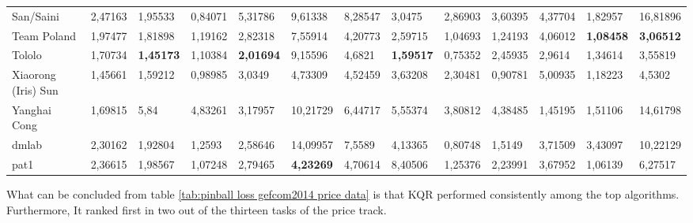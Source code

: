 \begin{table}[!ht]
\begin{adjustbox}{width=\textwidth}
\begin{tabular}{lllllllllllll}
  San/Saini                  & 2,47163          & 1,95533          & 0,84071 & 5,31786          & 9,61338          & 8,28547          & 3,0475           & 2,86903          & 3,60395          & 4,37704          & 1,82957          & 16,81896         \\
  Team Poland                & 1,97477          & 1,81898          & 1,19162          & 2,82318          & 7,55914          & 4,20773          & 2,59715          & 1,04693          & 1,24193          & 4,06012          & \textbf{1,08458} & \textbf{3,06512} \\
  Tololo                     & 1,70734          & \textbf{1,45173} & 1,10384          & \textbf{2,01694} & 9,15596          & 4,6821           & \textbf{1,59517} & 0,75352          & 2,45935          & 2,9614           & 1,34614          & 3,55819          \\
  Xiaorong (Iris) Sun        & 1,45661          & 1,59212          & 0,98985          & 3,0349           & 4,73309          & 4,52459          & 3,63208          & 2,30481          & 0,90781          & 5,00935          & 1,18223          & 4,5302           \\
  Yanghai Cong               & 1,69815          & 5,84             & 4,83261          & 3,17957          & 10,21729         & 6,44717          & 5,55374          & 3,80812          & 4,38485          & 1,45195          & 1,51106          & 14,61798         \\
  dmlab                      & 2,30162          & 1,92804          & 1,2593           & 2,58646          & 14,09957         & 7,5589           & 4,13365          & 0,80748          & 1,5149           & 3,71509          & 3,43097          & 10,22129         \\
  pat1                       & 2,36615          & 1,98567          & 1,07248          & 2,79465          & \textbf{4,23269} & 4,70614          & 8,40506          & 1,25376          & 2,23991          & 3,67952          & 1,06139          & 6,27517         
  
  \end{tabular}
    \end{adjustbox}
  \end{table}

What can be concluded from table \ref{tab:pinball loss gefcom2014 price data} is that KQR performed consistently among the top algorithms. Furthermore, It ranked first in two out of the thirteen tasks of the price track.
